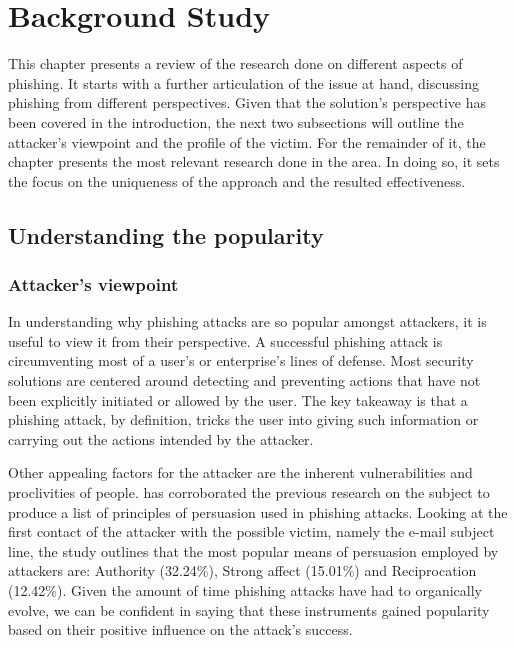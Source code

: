 
\chapter{Background Study}
\label{chap:bgStudy}
This chapter presents a review of the research done on different aspects of
phishing. It starts with a further articulation of the issue at hand, discussing
phishing from different perspectives. Given that the solution's perspective has
been covered in the introduction, the next two subsections will outline the
attacker's viewpoint and the profile of the victim. For the remainder of it, the
chapter presents the most relevant research done in the area. In doing so, it
sets the focus on the uniqueness of the approach and the resulted effectiveness.

\section{Understanding the popularity}

\subsection{Attacker's viewpoint}
In understanding why phishing attacks are so popular amongst attackers, it is
useful to view it from their perspective. A successful phishing attack is
circumventing most of a user's or enterprise's lines of defense. Most security
solutions are centered around detecting and preventing actions that have not
been explicitly initiated or allowed by the user. The key takeaway is that a
phishing attack, by definition, tricks the user into giving such information or
carrying out the actions intended by the attacker.

Other appealing factors for the attacker are the inherent vulnerabilities and
proclivities of people. \cite{PRINCIPLES_OF_PERSUASION} has corroborated the
previous research on the subject to produce a list of principles of persuasion
used in phishing attacks. Looking at the first contact of the attacker with the
possible victim, namely the e-mail subject line, the study outlines that the
most popular means of persuasion employed by attackers are: Authority (32.24\%),
Strong affect (15.01\%) and Reciprocation (12.42\%). Given the amount of time
phishing attacks have had to organically evolve, we can be confident in saying
that these instruments gained popularity based on their positive influence on
the attack's success.

